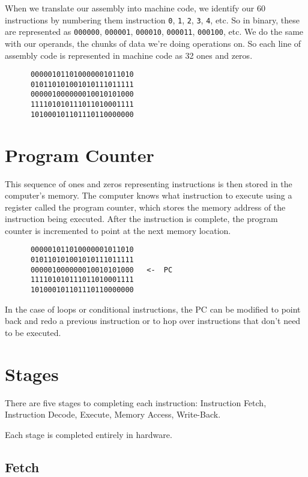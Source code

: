 \documentclass{IEEEtran}
\begin{document}
When we translate our assembly into machine code, we identify our 60 instructions by numbering them instruction \texttt{0}, \texttt{1}, \texttt{2}, \texttt{3}, \texttt{4}, etc. So in binary, these are represented as \texttt{000000}, \texttt{000001}, \texttt{000010}, \texttt{000011}, \texttt{000100}, etc. We do the same with our operands, the chunks of data we're doing operations on. So each line of assembly code is represented in machine code as 32 ones and zeros. \medskip

\scriptsize
\begin{verbatim}
      000001011010000001011010
      010110101001010111011111
      000001000000010010101000
      111101010111011010001111
      101000101101110110000000
\end{verbatim}
\normalsize


\section{Program Counter}

This sequence of ones and zeros representing instructions is then stored in the computer's memory. The computer knows what instruction to execute using a register called the program counter, which stores the memory address of the instruction being executed. After the instruction is complete, the program counter is incremented to point at the next memory location. \medskip 

\scriptsize
\begin{verbatim}
      000001011010000001011010
      010110101001010111011111
      000001000000010010101000   <-  PC
      111101010111011010001111
      101000101101110110000000
\end{verbatim}
\normalsize

In the case of loops or conditional instructions, the PC can be modified to point back and redo a previous instruction or to hop over instructions that don't need to be executed. \medskip

\section{Stages}

There are five stages to completing each instruction: Instruction Fetch, Instruction Decode, Execute, Memory Access, Write-Back.

Each stage is completed entirely in hardware. 

\subsection{Fetch}
\end{document}
